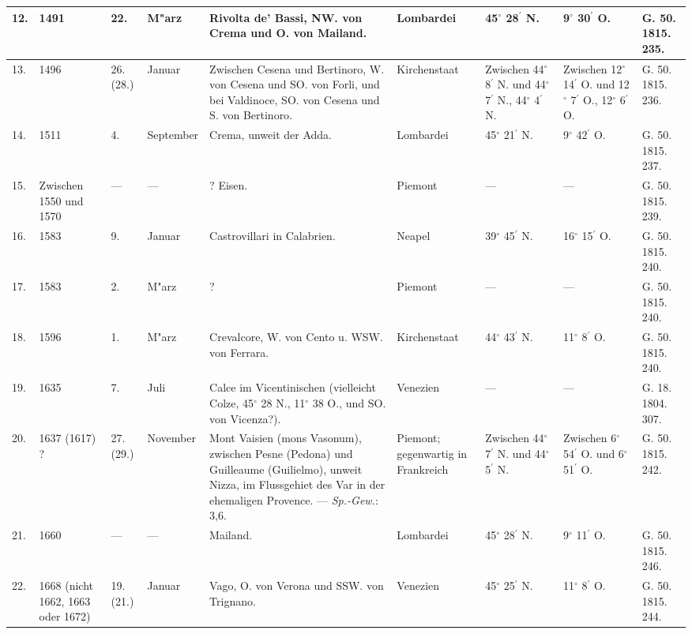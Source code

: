 \documentclass[a4paper, 8pt, oneside, polutonikogreek, german]{article}
\begin{document}
\begin{center}
\begin{longtable}{|p{3mm}|p{13mm}|p{5mm}|p{16mm}|p{25mm}|p{18mm}|p{13mm}|p{13mm}|p{13mm}|}
        12. & 1491 & 22. & M"arz & Rivolta de’ Bassi, NW. von Crema und O. von Mailand. & Lombardei & 45$^\circ$ 28$^\prime$ N. & 9$^\circ$ 30$^\prime$ O. & G. 50. 1815. 235. \\ \hline
        13. & 1496 & 26. (28.) & Januar & Zwischen Cesena und Bertinoro, W. von Cesena und SO. von Forli, und bei Valdinoce, SO. von Cesena und S. von Bertinoro. & Kirchenstaat & Zwischen 44$^\circ$ 8$^\prime$ N. und 44$^\circ$ 7$^\prime$ N., 44$^\circ$ 4$^\prime$ N. & Zwischen 12$^\circ$ 14$^\prime$ O. und 12$^\circ$ 7$^\prime$ O., 12$^\circ$ 6$^\prime$ O. & G. 50. 1815. 236. \\ \hline
        14. & 1511 & 4. & September & Crema, unweit der Adda. & Lombardei & 45$^\circ$ 21$^\prime$ N. & 9$^\circ$ 42$^\prime$ O. & G. 50. 1815. 237. \\ \hline
        15. & Zwischen 1550 und 1570 & --- & --- & ? Eisen. & Piemont & --- & --- & G. 50. 1815. 239. \\ \hline
        16. & 1583 & 9. & Januar & Castrovillari in Calabrien. & Neapel & 39$^\circ$ 45$^\prime$ N. & 16$^\circ$ 15$^\prime$ O. & G. 50. 1815. 240. \\ \hline
        17. & 1583 & 2. & M"arz & ? & Piemont & --- & --- & G. 50. 1815. 240. \\ \hline
        18. & 1596 & 1. & M"arz & Crevalcore, W. von Cento u. WSW. von Ferrara. & Kirchenstaat & 44$^\circ$ 43$^\prime$ N. & 11$^\circ$ 8$^\prime$ O. & G. 50. 1815. 240. \\ \hline
        19. & 1635 & 7. & Juli & Calce im Vicentinischen (vielleicht Colze, 45$^\circ$ 28 N., 11$^\circ$ 38 O., und SO. von Vicenza?). & Venezien & --- & --- & G. 18. 1804. 307. \\ \hline
        20. & 1637 (1617) ? & 27. (29.) & November & Mont Vaisien (mons Vasonum), zwischen Pesne (Pedona) und Guilleaume (Guilielmo), unweit Nizza, im Flussgehiet des Var in der ehemaligen Provence. --- \emph{Sp.-Gew.}: 3,6. & Piemont; gegenwartig in Frankreich & Zwischen 44$^\circ$ 7$^\prime$ N. und 44$^\circ$ 5$^\prime$ N. & Zwischen 6$^\circ$ 54$^\prime$ O. und 6$^\circ$ 51$^\prime$ O. & G. 50. 1815. 242. \\ \hline
        21. & 1660 & --- & --- & Mailand. & Lombardei & 45$^\circ$ 28$^\prime$ N. & 9$^\circ$ 11$^\prime$ O. & G. 50. 1815. 246. \\ \hline
        22. & 1668 (nicht 1662, 1663 oder 1672) & 19. (21.) & Januar & Vago, O. von Verona und SSW. von Trignano. & Venezien & 45$^\circ$ 25$^\prime$ N. & 11$^\circ$ 8$^\prime$ O. & G. 50. 1815. 244. \\ \hline

\end{longtable}
\end{center}
\end{document}
